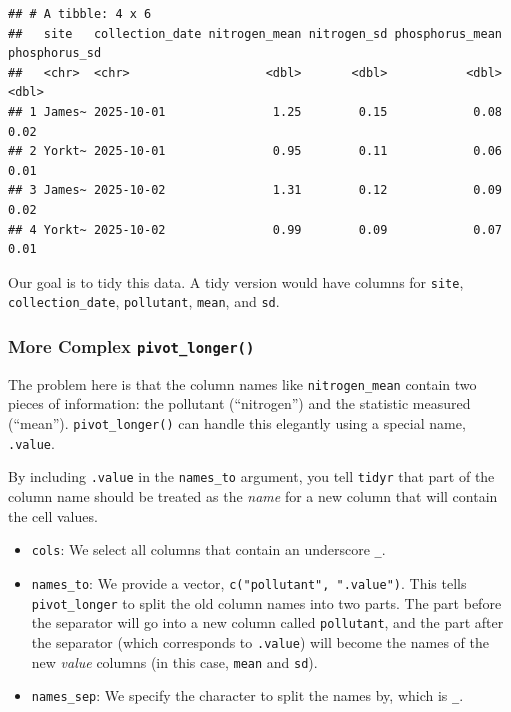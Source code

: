 \documentclass[
  11pt,
]{article}
\providecommand{\tightlist}{%
  \setlength{\itemsep}{0pt}\setlength{\parskip}{0pt}}
\begin{document}
\begin{verbatim}
## # A tibble: 4 x 6
##   site   collection_date nitrogen_mean nitrogen_sd phosphorus_mean phosphorus_sd
##   <chr>  <chr>                   <dbl>       <dbl>           <dbl>         <dbl>
## 1 James~ 2025-10-01               1.25        0.15            0.08          0.02
## 2 Yorkt~ 2025-10-01               0.95        0.11            0.06          0.01
## 3 James~ 2025-10-02               1.31        0.12            0.09          0.02
## 4 Yorkt~ 2025-10-02               0.99        0.09            0.07          0.01
\end{verbatim}

Our goal is to tidy this data. A tidy version would have columns for
\texttt{site}, \texttt{collection\_date}, \texttt{pollutant},
\texttt{mean}, and \texttt{sd}.

\subsubsection{\texorpdfstring{More Complex
\texttt{pivot\_longer()}}{More Complex pivot\_longer()}}\label{more-complex-pivot_longer}

The problem here is that the column names like \texttt{nitrogen\_mean}
contain two pieces of information: the pollutant (``nitrogen'') and the
statistic measured (``mean''). \texttt{pivot\_longer()} can handle this
elegantly using a special name, \texttt{.value}.

By including \texttt{.value} in the \texttt{names\_to} argument, you
tell \texttt{tidyr} that part of the column name should be treated as
the \emph{name} for a new column that will contain the cell values.

\begin{itemize}
\tightlist
\item
  \texttt{cols}: We select all columns that contain an underscore
  \texttt{\_}.
\item
  \texttt{names\_to}: We provide a vector,
  \texttt{c("pollutant",\ ".value")}. This tells \texttt{pivot\_longer}
  to split the old column names into two parts. The part before the
  separator will go into a new column called \texttt{pollutant}, and the
  part after the separator (which corresponds to \texttt{.value}) will
  become the names of the new \emph{value} columns (in this case,
  \texttt{mean} and \texttt{sd}).
\item
  \texttt{names\_sep}: We specify the character to split the names by,
  which is \texttt{\_}.
\end{itemize}
\end{document}
